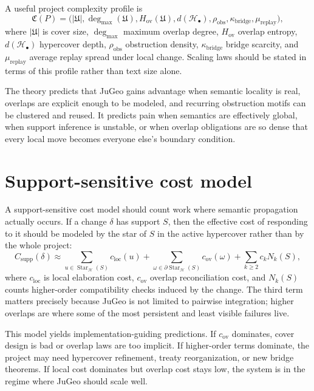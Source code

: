 \documentclass[11pt]{report}
\begin{document}
A useful project complexity profile is
\[
\mathfrak{C}(P)
=
\bigl(
|\mathfrak{U}|,
\deg_{\max}(\mathfrak{U}),
H_{\mathrm{ov}}(\mathfrak{U}),
d(\mathcal{H}_\bullet),
\rho_{\mathrm{obs}},
\kappa_{\mathrm{bridge}},
\mu_{\mathrm{replay}}
\bigr),
\]
where $|\mathfrak{U}|$ is cover size, $\deg_{\max}$ maximum overlap degree, $H_{\mathrm{ov}}$ overlap entropy, $d(\mathcal{H}_\bullet)$ hypercover depth, $\rho_{\mathrm{obs}}$ obstruction density, $\kappa_{\mathrm{bridge}}$ bridge scarcity, and $\mu_{\mathrm{replay}}$ average replay spread under local change. Scaling laws should be stated in terms of this profile rather than text size alone.

The theory predicts that JuGeo gains advantage when semantic locality is real, overlaps are explicit enough to be modeled, and recurring obstruction motifs can be clustered and reused. It predicts pain when semantics are effectively global, when support inference is unstable, or when overlap obligations are so dense that every local move becomes everyone else's boundary condition.

\section{Support-sensitive cost model}
A support-sensitive cost model should count work where semantic propagation actually occurs. If a change $\delta$ has support $S$, then the effective cost of responding to it should be modeled by the star of $S$ in the active hypercover rather than by the whole project:
\[
C_{\mathrm{supp}}(\delta)
\approx
\sum_{u \in \operatorname{Star}_{\mathcal{H}}(S)} c_{\mathrm{loc}}(u)
+
\sum_{\omega \in \partial \operatorname{Star}_{\mathcal{H}}(S)} c_{\mathrm{ov}}(\omega)
+
\sum_{k \ge 2} c_k N_k(S),
\]
where $c_{\mathrm{loc}}$ is local elaboration cost, $c_{\mathrm{ov}}$ overlap reconciliation cost, and $N_k(S)$ counts higher-order compatibility checks induced by the change. The third term matters precisely because JuGeo is not limited to pairwise integration; higher overlaps are where some of the most persistent and least visible failures live.

This model yields implementation-guiding predictions. If $c_{\mathrm{ov}}$ dominates, cover design is bad or overlap laws are too implicit. If higher-order terms dominate, the project may need hypercover refinement, treaty reorganization, or new bridge theorems. If local cost dominates but overlap cost stays low, the system is in the regime where JuGeo should scale well.
\end{document}
